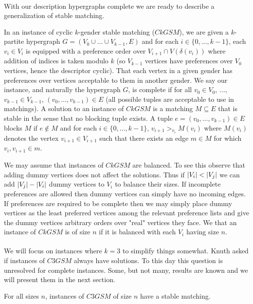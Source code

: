 \paragraph{}
With our description hypergraphs complete we are ready to describe a generalization of stable matching.
\begin{definition}
In an instance of cyclic $k$-gender stable matching ($CkGSM$), we are given a $k$-partite hypergraph $G=(V_0 \cup \dots \cup V_{k-1}, E)$ and for each $i \in \{0,\dots,k-1\}$, each $v_i \in V_i$ is equipped with a preference order over $V_{i+1} \cap V(\delta(v_i))$ where addition of indices is taken modulo $k$ (so $V_{k-1}$ vertices have preferences over $V_0$ vertices, hence the descriptor cyclic). That each vertex in a given gender has preferences over vertices acceptable to them in another gender. We say our instance, and naturally the hypergraph $G$, is complete if for all $v_0 \in V_0$, $\dots$, $v_{k-1} \in V_{k-1}$, $(v_0,\dots,v_{k-1}) \in E$ (all possible tuples are acceptable to use in matchings). A solution to an instance of $CkGSM$ is a matching $M \subseteq E$ that is stable in the sense that no blocking tuple exists. A tuple $e=(v_0,\dots, v_{k-1}) \in E$ blocks $M$ if $e\not\in M$ and for each $i \in \{0,\dots, k-1\}$, $v_{i+1} >_{v_i} M(v_i)$ where $M(v_i)$ denotes the vertex $v_{i+1} \in V_{i+1}$ such that there exists an edge $m \in M$ for which $v_i, v_{i+1} \in m$.
\end{definition}
\begin{note}
We may assume that instances of $CkGSM$ are balanced. To see this observe that adding dummy vertices does not affect the solutions. Thus if $\left|V_i\right| < \left|V_j\right|$ we can add $\left|V_j\right| - \left|V_i\right|$ dummy vertices to $V_i$ to balance their sizes. If incomplete preferences are allowed then dummy vertices can simply have no incoming edges. If preferences are required to be complete then we may simply place dummy vertices as the least preferred vertices among the relevant preference lists and give the dummy vertices arbitrary orders over "real" vertices they face. We that an instance of $CkGSM$ is of size $n$ if it is balanced with each $V_i$ having size $n$.
\end{note}
\paragraph{}
We will focus on instances where $k=3$ to simplify things somewhat. Knuth asked if instances of $C3GSM$ always have solutions. To this day this question is unresolved for complete instances. Some, but not many, results are known and we will present them in the next section.
\begin{conjecture}\label{conj:stab}
For all sizes $n$, instances of $C3GSM$ of size $n$ have a stable matching.
\end{conjecture} 
